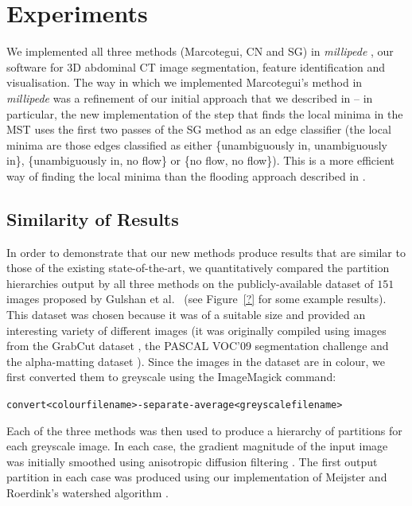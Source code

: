 \documentclass[preprint,a4paper]{elsarticle}
\begin{document}
\section{Experiments}
\label{sec:experiments}

We implemented all three methods (Marcotegui, CN and SG) in \emph{millipede} \cite{millipede}, our software for 3D abdominal CT image segmentation, feature identification and visualisation. The way in which we implemented Marcotegui's method in \emph{millipede} was a refinement of our initial approach that we described in \cite{golodetz08} -- in particular, the new implementation of the step that finds the local minima in the MST uses the first two passes of the SG method as an edge classifier (the local minima are those edges classified as either \{unambiguously in, unambiguously in\}, \{unambiguously in, no flow\} or \{no flow, no flow\}). This is a more efficient way of finding the local minima than the flooding approach described in \cite{golodetz08}.

\subsection{Similarity of Results}
\label{subsec:experiments-similarity}

In order to demonstrate that our new methods produce results that are similar to those of the existing state-of-the-art, we quantitatively compared the partition hierarchies output by all three methods on the publicly-available dataset of $151$ images proposed by Gulshan et al.\ \cite{gulshan10} (see Figure~\ref{?} for some example results). This dataset was chosen because it was of a suitable size and provided an interesting variety of different images (it was originally compiled using images from the GrabCut dataset \cite{rother04}, the PASCAL VOC'09 segmentation challenge \cite{everingham09} and the alpha-matting dataset \cite{rhemann09}). Since the images in the dataset are in colour, we first converted them to greyscale using the ImageMagick \cite{imagemagick} command:
%
\begin{alltt}\begin{center}
convert <colour filename> -separate -average <greyscale filename>
\end{center}\end{alltt}
%
Each of the three methods was then used to produce a hierarchy of partitions for each greyscale image. In each case, the gradient magnitude of the input image was initially smoothed using anisotropic diffusion filtering \cite{perona90}. The first output partition in each case was produced using our implementation of Meijster and Roerdink's watershed algorithm \cite{meijster98}.
\end{document}

